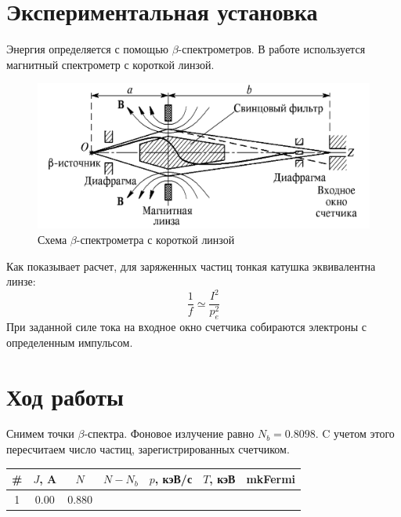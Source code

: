 \documentclass[a4paper, 12pt]{article}
\begin{document}
		\section{Экспериментальная установка}
		Энергия определяется с помощью $\beta$-спектрометров. В работе используется магнитный спектрометр с короткой линзой.
		\begin{figure}[!htb]
			\centering
			\includegraphics[width=0.8\linewidth]{pic2}
			\caption{Схема $\beta$-спектрометра с короткой линзой}
		\end{figure}
		Как показывает расчет, для заряженных частиц тонкая катушка эквивалентна линзе:
		\begin{equation}
			\frac{1}{f} \simeq \frac{I^2}{p_e^2}
		\end{equation}
		При заданной силе тока на входное окно счетчика собираются электроны с определенным импульсом.
		\section{Ход работы}
		Снимем точки $\beta$-спектра. Фоновое излучение равно $N_b = 0.8098$. C учетом этого пересчитаем число частиц, зарегистрированных счетчиком.
		\begin{table}[!htb]
			\centering
			\begin{tabular}{|c|c|c|c|c|c|c|}
				\hline
				\# & $J$, A & $N$ & $N-N_b$ & $p$, кэВ/с & $T$, кэВ & mkFermi\\
				\hline
				1 & 0.00 & 0.880 & 
				\hline
			\end{tabular}
		\end{table}
\end{document}
